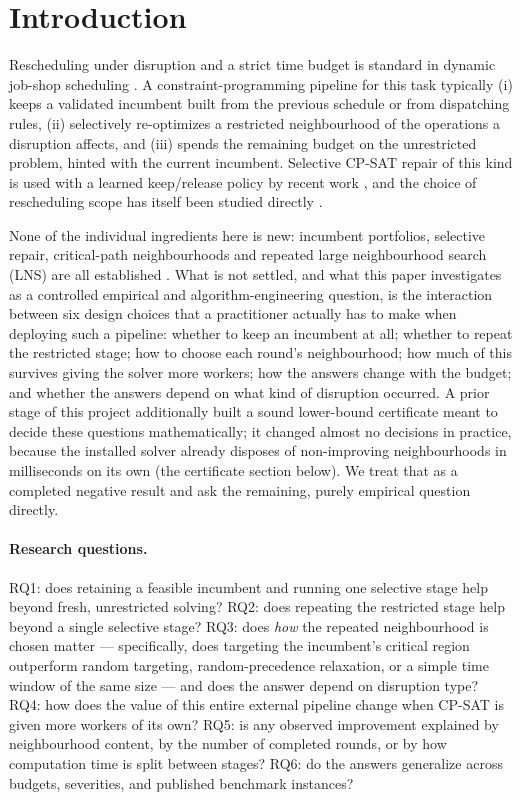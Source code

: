 \documentclass[letterpaper]{article} %
\begin{document}
\section{Introduction}

Rescheduling under disruption and a strict time budget is standard in dynamic job-shop scheduling \citep{vieira2003,ouelhadj2009}. A constraint-programming pipeline for this task typically (i) keeps a validated incumbent built from the previous schedule or from dispatching rules, (ii) selectively re-optimizes a restricted neighbourhood of the operations a disruption affects, and (iii) spends the remaining budget on the unrestricted problem, hinted with the current incumbent. Selective CP-SAT repair of this kind is used with a learned keep/release policy by recent work \citep{linyang2026}, and the choice of rescheduling scope has itself been studied directly \citep{sun2026}.

None of the individual ingredients here is new: incumbent portfolios, selective repair, critical-path neighbourhoods and repeated large neighbourhood search (LNS) are all established \citep{balas1969,vanlaarhoven1992,nowicki1996,shaw1998,godard2005,gomes2001}. What is not settled, and what this paper investigates as a controlled empirical and algorithm-engineering question, is the interaction between six design choices that a practitioner actually has to make when deploying such a pipeline: whether to keep an incumbent at all; whether to repeat the restricted stage; how to choose each round's neighbourhood; how much of this survives giving the solver more workers; how the answers change with the budget; and whether the answers depend on what kind of disruption occurred. A prior stage of this project additionally built a sound lower-bound certificate meant to decide these questions mathematically; it changed almost no decisions in practice, because the installed solver already disposes of non-improving neighbourhoods in milliseconds on its own (the certificate section below). We treat that as a completed negative result and ask the remaining, purely empirical question directly.

\paragraph{Research questions.} RQ1: does retaining a feasible incumbent and running one selective stage help beyond fresh, unrestricted solving? RQ2: does repeating the restricted stage help beyond a single selective stage? RQ3: does \emph{how} the repeated neighbourhood is chosen matter --- specifically, does targeting the incumbent's critical region outperform random targeting, random-precedence relaxation, or a simple time window of the same size --- and does the answer depend on disruption type? RQ4: how does the value of this entire external pipeline change when CP-SAT is given more workers of its own? RQ5: is any observed improvement explained by neighbourhood content, by the number of completed rounds, or by how computation time is split between stages? RQ6: do the answers generalize across budgets, severities, and published benchmark instances?
\end{document}
